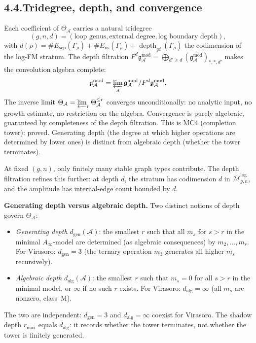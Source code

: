 \documentclass[11pt,reqno]{amsart}
\theoremstyle{definition}
\theoremstyle{remark}
\providecommand{\cA}{\mathcal{A}}
\providecommand{\cM}{\mathcal{M}}
\providecommand{\gAmod}{\mathfrak{g}^{\mathrm{mod}}_\cA}
\numberwithin{equation}{section}
\begin{document}
\subsection*{4.4.\enspace Tridegree, depth, and convergence}

Each coefficient of $\Theta_\cA$ carries a natural tridegree
\[
(g,n,d)=(\text{loop genus},\text{external degree},\text{log boundary depth}),
\]
with $d(\rho)=\#E_{\mathrm{sep}}(\Gamma_\rho)+\#E_{\mathrm{ns}}(\Gamma_\rho)+\operatorname{depth}_{\mathrm{pf}}(\Gamma_\rho)$
the codimension of the log-FM stratum. The depth filtration
$F^d\gAmod=\bigoplus_{d'\ge d}(\gAmod)_{*,*,d'}$ makes the convolution
algebra complete:
\[
\gAmod=\varprojlim_d\gAmod/F^d\gAmod.
\]
The inverse limit $\Theta_\cA=\varprojlim_r\Theta_\cA^{\le r}$
converges unconditionally: no analytic input, no growth estimate, no
restriction on the algebra. Convergence is purely algebraic,
guaranteed by completeness of the depth filtration. This is MC4
(completion tower): proved. Generating depth (the degree at
which higher operations are determined by lower ones) is distinct
from algebraic depth (whether the tower terminates).

At fixed $(g,n)$, only finitely many stable graph types contribute.
The depth filtration refines this further: at depth $d$, the stratum
has codimension $d$ in $\overline{\cM}_{g,n}^{\log}$, and the
amplitude has internal-edge count bounded by $d$.

\medskip
\noindent\textbf{Generating depth versus algebraic depth.}\enspace
Two distinct notions of depth govern $\Theta_\cA$:
\begin{itemize}
\item \emph{Generating depth} $d_{\mathrm{gen}}(\cA)$: the smallest
$r$ such that all $m_s$ for $s>r$ in the minimal $A_\infty$-model
are determined (as algebraic consequences) by $m_2,\ldots,m_r$.
For Virasoro: $d_{\mathrm{gen}}=3$ (the ternary operation $m_3$
generates all higher $m_s$ recursively).
\item \emph{Algebraic depth} $d_{\mathrm{alg}}(\cA)$: the smallest
$r$ such that $m_s=0$ for all $s>r$ in the minimal model, or
$\infty$ if no such $r$ exists. For Virasoro:
$d_{\mathrm{alg}}=\infty$ (all $m_s$ are nonzero, class~M).
\end{itemize}
The two are independent: $d_{\mathrm{gen}}=3$ and
$d_{\mathrm{alg}}=\infty$ coexist for Virasoro. The shadow depth
$r_{\max}$ equals $d_{\mathrm{alg}}$: it records whether the tower
terminates, not whether the tower is finitely generated.
\end{document}

